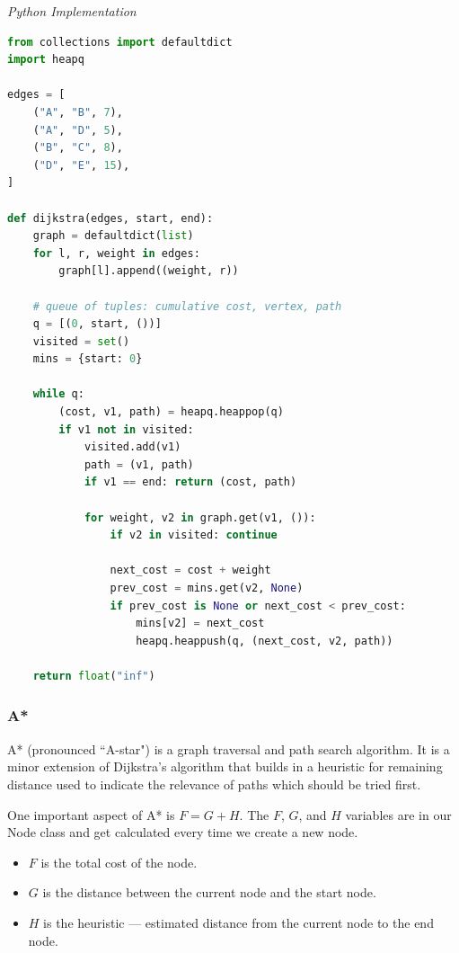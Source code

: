 \documentclass{article}
\begin{document}
\vspace{8pt} \emph{Python Implementation}
\begin{lstlisting}[language=Python]
from collections import defaultdict
import heapq 

edges = [
    ("A", "B", 7),
    ("A", "D", 5),
    ("B", "C", 8),
    ("D", "E", 15),
]

def dijkstra(edges, start, end):
    graph = defaultdict(list)
    for l, r, weight in edges:
        graph[l].append((weight, r))

    # queue of tuples: cumulative cost, vertex, path
    q = [(0, start, ())] 
    visited = set()
    mins = {start: 0}
    
    while q:
        (cost, v1, path) = heapq.heappop(q)
        if v1 not in visited:
            visited.add(v1)
            path = (v1, path)
            if v1 == end: return (cost, path)

            for weight, v2 in graph.get(v1, ()):
                if v2 in visited: continue
                
                next_cost = cost + weight
                prev_cost = mins.get(v2, None)
                if prev_cost is None or next_cost < prev_cost:
                    mins[v2] = next_cost
                    heapq.heappush(q, (next_cost, v2, path))

    return float("inf")
\end{lstlisting}

    \subsubsection{A*}
    A* (pronounced ``A-star") is a graph traversal and path search algorithm. It is a minor extension of Dijkstra's algorithm that builds in a heuristic for remaining distance used to indicate the relevance of paths which should be tried first.
    
    One important aspect of A* is $F = G + H$. The $F$, $G$, and $H$ variables are in our Node class and get calculated every time we create a new node. 
    \begin{itemize}
        \item $F$ is the total cost of the node.
        \item $G$ is the distance between the current node and the start node.
        \item $H$ is the heuristic — estimated distance from the current node to the end node.
    \end{itemize}
    
\end{document}
